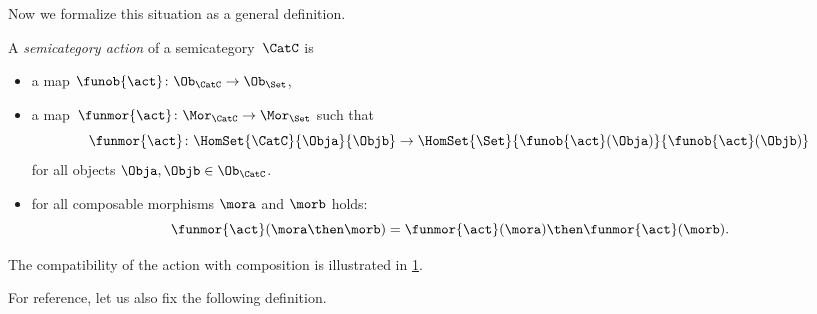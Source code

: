 Now we formalize this situation as a general definition. 

\begin{ctdefinition}
    \label{def:semicategory-action}
    A \emph{semicategory action} of a semicategory~$\CatC$ is
    
    \constit
    \begin{itemize}
        \item a map $\funob{\act} \colon \Ob_{\CatC} \to \Ob_{\Set}$,
        \item a map~$\funmor{\act} \colon \Mor_\CatC \to \Mor_\Set$ such that 
        \begin{equation}
\funmor{\act} \colon  \HomSet{\CatC}{\Obja}{\Objb} \to \HomSet{\Set}{ \funob{\act}(\Obja)}{\funob{\act}(\Objb)}
        \end{equation}
        for all objects $\Obja, \Objb \in \Ob_{\CatC}$. 
    \end{itemize}

    
    \condit
    
    \begin{itemize}
   \item for all composable morphisms $\mora$ and $\morb$ holds: 
   \begin{equation}
\funmor{\act}(\mora \then \morb) = \funmor{\act}(\mora) \then \funmor{\act}(\morb). 
    \end{equation}
    \end{itemize}
\end{ctdefinition}

The compatibility of the action with composition is illustrated in \cref{fig:semicat_ac_comm}. 

\begin{figure}[h!]
\label{fig:semicat_ac_comm}
    \begin{center}
    \end{center}
    \caption{}
\end{figure}

For reference, let us also fix the following definition. 


